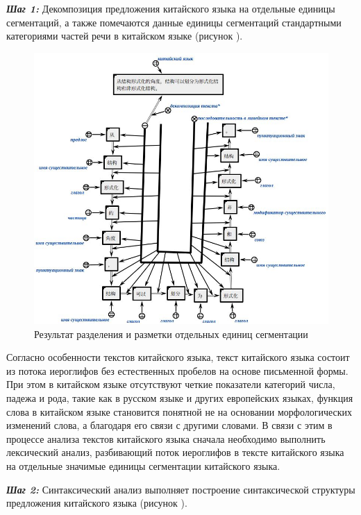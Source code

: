 \textbf{\textit{Шаг 1:}} Декомпозиция предложения китайского языка на отдельные единицы сегментаций, а также помечаются данные единицы сегментаций стандартными категориями частей речи в китайском языке (рисунок \textit{}).
\begin{figure}[H]
	\centering
	\includegraphics[scale=0.7]{images/part4/chapter_chinese/segment_chinese_sentence.png}
	\caption{Результат разделения и разметки отдельных единиц сегментации}
	\label{fig:segment-chinese}
\end{figure}

Согласно особенности текстов китайского языка, текст китайского языка состоит из потока иероглифов без естественных пробелов на основе письменной формы. При этом в китайском языке отсутствуют четкие показатели категорий числа, падежа и рода, такие как в русском языке и других европейских языках, функция слова в китайском языке становится понятной не на основании морфологических изменений слова, а благодаря его связи с другими словами. В связи с этим в процессе анализа текстов китайского языка сначала необходимо выполнить лексический анализ, разбивающий поток иероглифов в тексте китайского языка на отдельные значимые единицы сегментации китайского языка. 

\textbf{\textit{Шаг 2:}} Синтаксический анализ выполняет построение синтаксической структуры предложения китайского языка (рисунок \textit{}).


